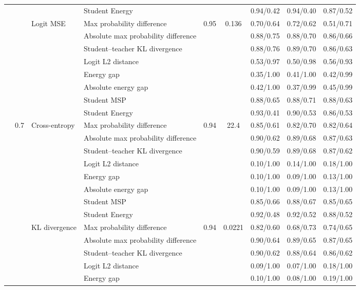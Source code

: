 \documentclass[border=2pt]{standalone}
\begin{document}
\begin{tabular}{llllccccc}
 &  &  & Student Energy &  &  & 0.94/0.42 & 0.94/0.40 & 0.87/0.52 \\
\addlinespace
 &  & Logit MSE & Max probability difference & 0.95 & 0.136 & 0.70/0.64 & 0.72/0.62 & 0.51/0.71 \\
 &  &  & Absolute max probability difference &  &  & 0.88/0.75 & 0.88/0.70 & 0.86/0.66 \\
 &  &  & Student--teacher KL divergence &  &  & 0.88/0.76 & 0.89/0.70 & 0.86/0.63 \\
 &  &  & Logit L2 distance &  &  & 0.53/0.97 & 0.50/0.98 & 0.56/0.93 \\
 &  &  & Energy gap &  &  & 0.35/1.00 & 0.41/1.00 & 0.42/0.99 \\
 &  &  & Absolute energy gap &  &  & 0.42/1.00 & 0.37/0.99 & 0.45/0.99 \\
 &  &  & Student MSP &  &  & 0.88/0.65 & 0.88/0.71 & 0.88/0.63 \\
 &  &  & Student Energy &  &  & 0.93/0.41 & 0.90/0.53 & 0.86/0.53 \\
\addlinespace
 & 0.7 & Cross-entropy & Max probability difference & 0.94 & 22.4 & 0.85/0.61 & 0.82/0.70 & 0.82/0.64 \\
 &  &  & Absolute max probability difference &  &  & 0.90/0.62 & 0.89/0.68 & 0.87/0.63 \\
 &  &  & Student--teacher KL divergence &  &  & 0.90/0.59 & 0.89/0.68 & 0.87/0.62 \\
 &  &  & Logit L2 distance &  &  & 0.10/1.00 & 0.14/1.00 & 0.18/1.00 \\
 &  &  & Energy gap &  &  & 0.10/1.00 & 0.09/1.00 & 0.13/1.00 \\
 &  &  & Absolute energy gap &  &  & 0.10/1.00 & 0.09/1.00 & 0.13/1.00 \\
 &  &  & Student MSP &  &  & 0.85/0.66 & 0.88/0.67 & 0.85/0.65 \\
 &  &  & Student Energy &  &  & 0.92/0.48 & 0.92/0.52 & 0.88/0.52 \\
\addlinespace
 &  & KL divergence & Max probability difference & 0.94 & 0.0221 & 0.82/0.60 & 0.68/0.73 & 0.74/0.65 \\
 &  &  & Absolute max probability difference &  &  & 0.90/0.64 & 0.89/0.65 & 0.87/0.65 \\
 &  &  & Student--teacher KL divergence &  &  & 0.90/0.62 & 0.88/0.64 & 0.86/0.62 \\
 &  &  & Logit L2 distance &  &  & 0.09/1.00 & 0.07/1.00 & 0.18/1.00 \\
 &  &  & Energy gap &  &  & 0.10/1.00 & 0.08/1.00 & 0.19/1.00 \\

\end{tabular}
\end{document}
